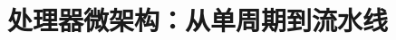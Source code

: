 \documentclass[../../main.tex]{subfiles}
\begin{document}
\chapter{处理器微架构：从单周期到流水线}
\label{ch:04-processor-core}






\end{document}
